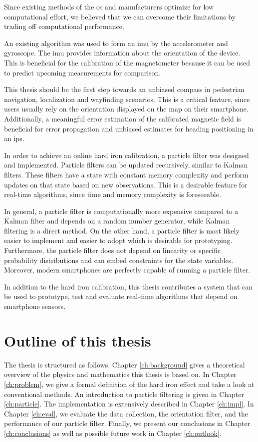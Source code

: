 Since existing methods of the \gls{os} and manufacturers optimize for low computational effort, we believed that we can overcome their limitations by trading off computational performance.

An existing algorithm was used to form an \gls{imu} by the accelerometer and gyroscope. The \gls{imu} provides information about the orientation of the device. This is beneficial for the calibration of the magnetometer because it can be used to predict upcoming measurements for comparison.

This thesis should be the first step towards an unbiased compass in pedestrian navigation, localization and wayfinding scenarios. This is a critical feature, since users usually rely on the orientation displayed on the map on their smartphone. Additionally, a meaningful error estimation of the calibrated magnetic field is beneficial for error propagation and unbiased estimates for heading positioning in an \gls{ips}.

In order to achieve an online hard iron calibration, a particle filter was designed and implemented. Particle filters can be updated recursively, similar to Kalman filters. These filters have a state with constant memory complexity and perform updates on that state based on new observations. This is a desirable feature for real-time algorithms, since time and memory complexity is foreseeable.

In general, a particle filter is computationally more expensive compared to a Kalman filter and depends on a random number generator, while Kalman filtering is a direct method. On the other hand, a particle filter is most likely easier to implement and easier to adopt which is desirable for prototyping. Furthermore, the particle filter does not depend on linearity or specific probability distributions and can embed constraints for the state variables. Moreover, modern smartphones are perfectly capable of running a particle filter.

In addition to the hard iron calibration, this thesis contributes a system that can be used to prototype, test and evaluate real-time algorithms that depend on smartphone sensors.

\section{Outline of this thesis}

The thesis is structured as follows. Chapter \ref{ch:background} gives a theoretical overview of the physics and mathematics this thesis is based on. In Chapter \ref{ch:problem}, we give a formal definition of the hard iron effect and take a look at conventional methods. An introduction to particle filtering is given in Chapter \ref{ch:particle}. The implementation is extensively described in Chapter \ref{ch:impl}. In Chapter \ref{ch:eval}, we evaluate the data collection, the orientation filter, and the performance of our particle filter. Finally, we present our conclusions in Chapter \ref{ch:conclusions} as well as possible future work in Chapter \ref{ch:outlook}.


